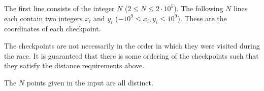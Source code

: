 
The first line consists of the integer $N$ ($2 \leq N \leq 2 \cdot 10^5$).
The following $N$ lines each contain two integers $x_i$ and $y_i$ ($-10^9 \leq x_i, y_i \leq 10^9$). These are the coordinates of each checkpoint. 

The checkpoints are not necessarily in the order in which they were visited during the race. It is guaranteed that there is some ordering of the 
checkpoints such that they satisfy the distance requirements above.

The $N$ points given in the input are all distinct.


